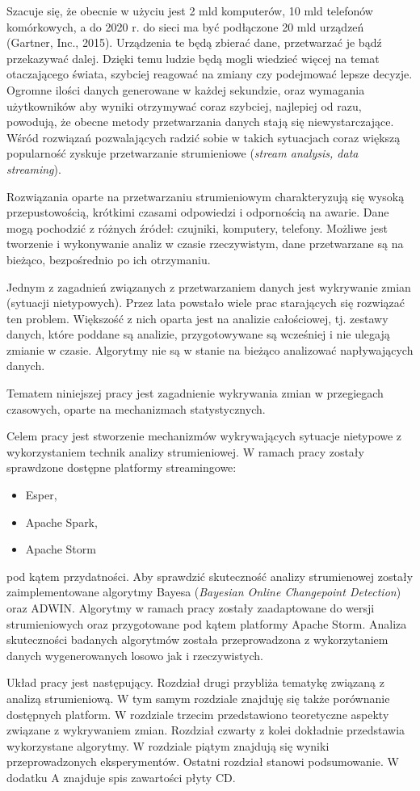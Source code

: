Szacuje się,
że obecnie w użyciu jest 2 mld komputerów,
10 mld telefonów komórkowych,
a do 2020 r. do sieci ma być podłączone 20 mld urządzeń (Gartner, Inc., 2015).
Urządzenia te będą zbierać dane,
przetwarzać je
bądź przekazywać dalej.
Dzięki temu ludzie będą mogli wiedzieć więcej na temat otaczającego świata,
szybciej reagować na zmiany
czy podejmować lepsze decyzje.
Ogromne ilości danych generowane w każdej sekundzie,
oraz wymagania użytkowników aby wyniki otrzymywać coraz szybciej,
najlepiej od razu,
powodują,
że obecne metody przetwarzania danych stają się niewystarczające.
Wśród rozwiązań pozwalających radzić sobie w takich sytuacjach
coraz większą popularność zyskuje przetwarzanie strumieniowe (\textit{stream analysis, data streaming}).

Rozwiązania oparte na przetwarzaniu strumieniowym charakteryzują się wysoką przepustowością,
krótkimi czasami odpowiedzi i odpornością na awarie.
Dane mogą pochodzić z różnych źródeł: czujniki, komputery, telefony.
Możliwe jest tworzenie i wykonywanie analiz w czasie rzeczywistym,
dane przetwarzane są na bieżąco,
bezpośrednio po ich otrzymaniu.

Jednym z zagadnień związanych z przetwarzaniem danych jest wykrywanie zmian (sytuacji nietypowych).
Przez lata powstało wiele prac starających się rozwiązać ten problem.
Większość z nich oparta jest na analizie całościowej,
tj. zestawy danych,
które poddane są analizie,
przygotowywane są wcześniej i nie ulegają zmianie w czasie.
Algorytmy nie są w stanie na bieżąco analizować napływających danych.

Tematem niniejszej pracy jest zagadnienie wykrywania zmian w przegiegach czasowych,
oparte na mechanizmach statystycznych.

Celem pracy jest stworzenie mechanizmów wykrywających sytuacje nietypowe
z wykorzystaniem technik analizy strumieniowej.
W ramach pracy zostały sprawdzone dostępne platformy streamingowe:
\begin{itemize}
  \item Esper,
  \item Apache Spark,
  \item Apache Storm
\end{itemize}
pod kątem przydatności.
Aby sprawdzić skuteczność analizy strumienowej zostały zaimplementowane algorytmy Bayesa (\textit{Bayesian Online Changepoint Detection})
oraz ADWIN.
Algorytmy w ramach pracy zostały zaadaptowane do wersji strumieniowych oraz przygotowane pod kątem platformy Apache Storm.
Analiza skuteczności badanych algorytmów została przeprowadzona z wykorzytaniem danych wygenerowanych losowo jak i rzeczywistych.

Układ pracy jest następujący.
Rozdział drugi przybliża tematykę związaną z analizą strumieniową.
W tym samym rozdziale znajduję się także porównanie dostępnych platform.
W rozdziale trzecim przedstawiono teoretyczne aspekty związane z wykrywaniem zmian.
Rozdział czwarty z kolei dokładnie przedstawia wykorzystane algorytmy.
W rozdziale piątym znajdują się wyniki przeprowadzonych eksperymentów.
Ostatni rozdział stanowi podsumowanie.
W dodatku A znajduje spis zawartości płyty CD.
